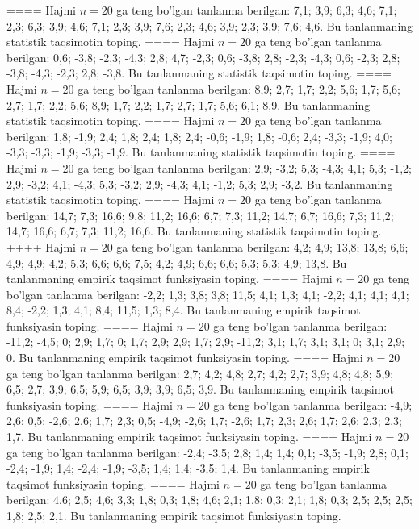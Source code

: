 ====
Hajmi \(n = 20\) ga teng bo'lgan tanlanma berilgan: 7,1; 3,9; 6,3; 4,6; 7,1; 2,3; 6,3; 3,9; 4,6; 7,1; 2,3; 3,9; 7,6; 2,3; 4,6; 3,9; 2,3; 3,9; 7,6; 4,6. Bu tanlanmaning statistik taqsimotin toping.
====
Hajmi \(n = 20\) ga teng bo'lgan tanlanma berilgan: 0,6; -3,8; -2,3; -4,3; 2,8; 4,7; -2,3; 0,6; -3,8; 2,8; -2,3; -4,3; 0,6; -2,3; 2,8; -3,8; -4,3; -2,3; 2,8; -3,8. Bu tanlanmaning statistik taqsimotin toping.
====
Hajmi \(n = 20\) ga teng bo'lgan tanlanma berilgan: 8,9; 2,7; 1,7; 2,2; 5,6; 1,7; 5,6; 2,7; 1,7; 2,2; 5,6; 8,9; 1,7; 2,2; 1,7; 2,7; 1,7; 5,6; 6,1; 8,9. Bu tanlanmaning statistik taqsimotin toping.
====
Hajmi \(n = 20\) ga teng bo'lgan tanlanma berilgan: 1,8; -1,9; 2,4; 1,8; 2,4; 1,8; 2,4; -0,6; -1,9; 1,8; -0,6; 2,4; -3,3; -1,9; 4,0; -3,3; -3,3; -1,9; -3,3; -1,9. Bu tanlanmaning statistik taqsimotin toping.
====
Hajmi \(n = 20\) ga teng bo'lgan tanlanma berilgan: 2,9; -3,2; 5,3; -4,3; 4,1; 5,3; -1,2; 2,9; -3,2; 4,1; -4,3; 5,3; -3,2; 2,9; -4,3; 4,1; -1,2; 5,3; 2,9; -3,2. Bu tanlanmaning statistik taqsimotin toping.
====
Hajmi \(n = 20\) ga teng bo'lgan tanlanma berilgan: 14,7; 7,3; 16,6; 9,8; 11,2; 16,6; 6,7; 7,3; 11,2; 14,7; 6,7; 16,6; 7,3; 11,2; 14,7; 16,6; 6,7; 7,3; 11,2; 16,6. Bu tanlanmaning statistik taqsimotin toping.
++++
Hajmi \(n = 20\) ga teng bo'lgan tanlanma berilgan: 4,2; 4,9; 13,8; 13,8; 6,6; 4,9; 4,9; 4,2; 5,3; 6,6; 6,6; 7,5; 4,2; 4,9; 6,6; 6,6; 5,3; 5,3; 4,9; 13,8. Bu tanlanmaning empirik taqsimot funksiyasin toping.
====
Hajmi \(n = 20\) ga teng bo'lgan tanlanma berilgan: -2,2; 1,3; 3,8; 3,8; 11,5; 4,1; 1,3; 4,1; -2,2; 4,1; 4,1; 4,1; 8,4; -2,2; 1,3; 4,1; 8,4; 11,5; 1,3; 8,4. Bu tanlanmaning empirik taqsimot funksiyasin toping.
====
Hajmi \(n = 20\) ga teng bo'lgan tanlanma berilgan: -11,2; -4,5; 0; 2,9; 1,7; 0; 1,7; 2,9; 2,9; 1,7; 2,9; -11,2; 3,1; 1,7; 3,1; 3,1; 0; 3,1; 2,9; 0. Bu tanlanmaning empirik taqsimot funksiyasin toping.
====
Hajmi \(n = 20\) ga teng bo'lgan tanlanma berilgan: 2,7; 4,2; 4,8; 2,7; 4,2; 2,7; 3,9; 4,8; 4,8; 5,9; 6,5; 2,7; 3,9; 6,5; 5,9; 6,5; 3,9; 3,9; 6,5; 3,9. Bu tanlanmaning empirik taqsimot funksiyasin toping.
====
Hajmi \(n = 20\) ga teng bo'lgan tanlanma berilgan: -4,9; 2,6; 0,5; -2,6; 2,6; 1,7; 2,3; 0,5; -4,9; -2,6; 1,7; -2,6; 1,7; 2,3; 2,6; 1,7; 2,6; 2,3; 2,3; 1,7. Bu tanlanmaning empirik taqsimot funksiyasin toping.
====
Hajmi \(n = 20\) ga teng bo'lgan tanlanma berilgan: -2,4; -3,5; 2,8; 1,4; 1,4; 0,1; -3,5; -1,9; 2,8; 0,1; -2,4; -1,9; 1,4; -2,4; -1,9; -3,5; 1,4; 1,4; -3,5; 1,4. Bu tanlanmaning empirik taqsimot funksiyasin toping.
====
Hajmi \(n = 20\) ga teng bo'lgan tanlanma berilgan: 4,6; 2,5; 4,6; 3,3; 1,8; 0,3; 1,8; 4,6; 2,1; 1,8; 0,3; 2,1; 1,8; 0,3; 2,5; 2,5; 2,5; 1,8; 2,5; 2,1. Bu tanlanmaning empirik taqsimot funksiyasin toping.
